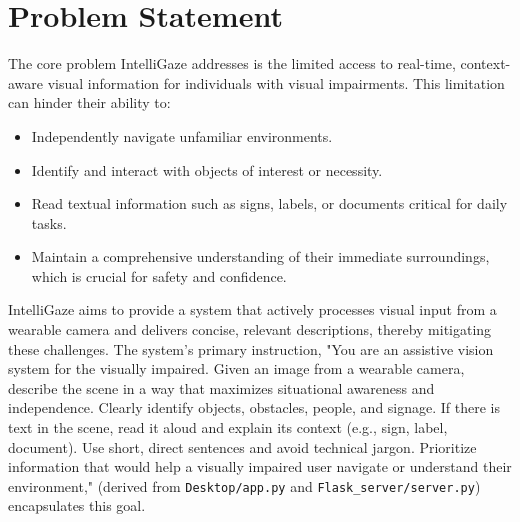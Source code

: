 \documentclass[12pt, a4paper]{report}
\begin{document}
\section{Problem Statement}
The core problem IntelliGaze addresses is the limited access to real-time, context-aware visual information for individuals with visual impairments. This limitation can hinder their ability to:
\begin{itemize}
    \item Independently navigate unfamiliar environments.
    \item Identify and interact with objects of interest or necessity.
    \item Read textual information such as signs, labels, or documents critical for daily tasks.
    \item Maintain a comprehensive understanding of their immediate surroundings, which is crucial for safety and confidence.
\end{itemize}
IntelliGaze aims to provide a system that actively processes visual input from a wearable camera and delivers concise, relevant descriptions, thereby mitigating these challenges. The system's primary instruction, "You are an assistive vision system for the visually impaired. Given an image from a wearable camera, describe the scene in a way that maximizes situational awareness and independence. Clearly identify objects, obstacles, people, and signage. If there is text in the scene, read it aloud and explain its context (e.g., sign, label, document). Use short, direct sentences and avoid technical jargon. Prioritize information that would help a visually impaired user navigate or understand their environment," (derived from \texttt{Desktop/app.py} and \texttt{Flask\_server/server.py}) encapsulates this goal.
\end{document}
